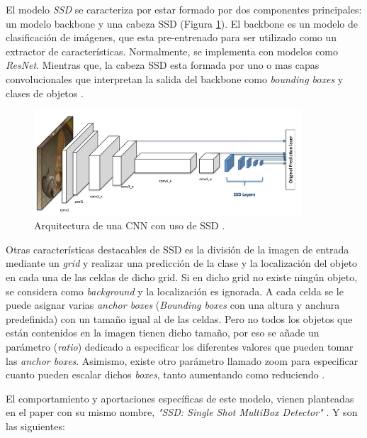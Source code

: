 El modelo \textit{SSD} se caracteriza por estar formado por dos componentes principales: un modelo backbone y una cabeza SSD (Figura \ref{fig:ssd}). El backbone es un modelo de clasificación de imágenes, que esta pre-entrenado para ser utilizado como un extractor de características. Normalmente, se implementa con modelos como \textit{ResNet}. Mientras que, la cabeza SSD esta formada por uno o mas capas convolucionales que interpretan la salida del backbone como \textit{bounding boxes} y clases de objetos \cite{ssdwork}. 

\begin{figure}[htp]
	\centering
	\includegraphics[width=10cm]{imagenes/cnnssd.png}
	\caption[Arquitectura de una CNN con uso de SSD.]{Arquitectura de una CNN con uso de SSD \cite{ssdwork}.}
	\label{fig:ssd}
\end{figure}

Otras características destacables de SSD es la división de la imagen de entrada mediante un \textit{grid} y realizar una predicción de la clase y la localización del objeto en cada una de las celdas de dicho grid. Si en dicho grid no existe ningún objeto, se considera como \textit{background} y la localización es ignorada. A cada celda se le puede asignar varias \textit{anchor boxes} (\textit{Bounding boxes} con una altura y anchura predefinida) con un tamaño igual al de las celdas. Pero no todos los objetos que están contenidos en la imagen tienen dicho tamaño, por eso se añade un parámetro (\textit{ratio}) dedicado a especificar los diferentes valores que pueden tomar las \textit{anchor boxes}. Asimismo, existe otro parámetro llamado zoom para especificar cuanto pueden escalar dichos \textit{boxes}, tanto aumentando como reduciendo \cite{ssdwork}.

El comportamiento y aportaciones específicas de este modelo, vienen planteadas en el paper con su mismo nombre, \textit{"SSD: Single Shot MultiBox Detector"} \cite{ssd}. Y son las siguientes:

